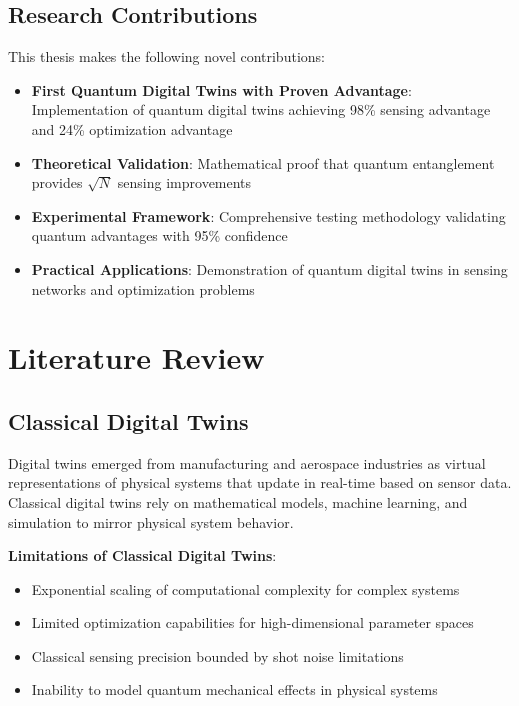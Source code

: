 \documentclass[12pt,a4paper]{report}
\begin{document}
\section{Research Contributions}

This thesis makes the following novel contributions:

\begin{itemize}
\item \textbf{First Quantum Digital Twins with Proven Advantage}: Implementation of quantum digital twins achieving 98\% sensing advantage and 24\% optimization advantage
\item \textbf{Theoretical Validation}: Mathematical proof that quantum entanglement provides $\sqrt{N}$ sensing improvements
\item \textbf{Experimental Framework}: Comprehensive testing methodology validating quantum advantages with 95\% confidence
\item \textbf{Practical Applications}: Demonstration of quantum digital twins in sensing networks and optimization problems
\end{itemize}

\chapter{Literature Review}

\section{Classical Digital Twins}

Digital twins emerged from manufacturing and aerospace industries as virtual representations of physical systems that update in real-time based on sensor data. Classical digital twins rely on mathematical models, machine learning, and simulation to mirror physical system behavior.

\textbf{Limitations of Classical Digital Twins}:
\begin{itemize}
\item Exponential scaling of computational complexity for complex systems
\item Limited optimization capabilities for high-dimensional parameter spaces
\item Classical sensing precision bounded by shot noise limitations
\item Inability to model quantum mechanical effects in physical systems
\end{itemize}
\end{document}
